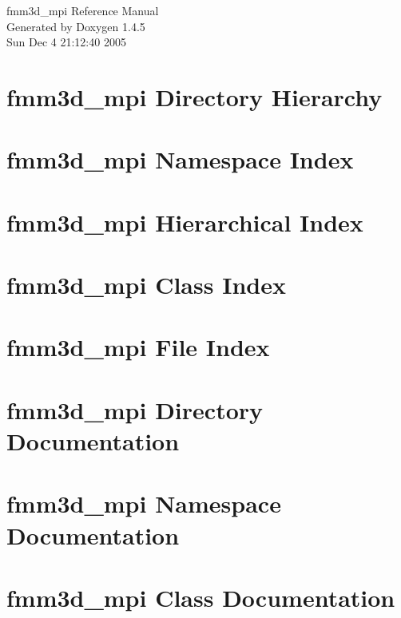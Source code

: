 \documentclass[a4paper]{book}
\begin{document}
\begin{titlepage}
\vspace*{7cm}
\begin{center}
{\Large fmm3d\_\-mpi Reference Manual}\\
\vspace*{1cm}
{\large Generated by Doxygen 1.4.5}\\
\vspace*{0.5cm}
{\small Sun Dec 4 21:12:40 2005}\\
\end{center}
\end{titlepage}
\clearemptydoublepage
{}
\tableofcontents
\clearemptydoublepage
{}
\chapter{fmm3d\_\-mpi Directory Hierarchy}

\chapter{fmm3d\_\-mpi Namespace Index}

\chapter{fmm3d\_\-mpi Hierarchical Index}

\chapter{fmm3d\_\-mpi Class Index}

\chapter{fmm3d\_\-mpi File Index}

\chapter{fmm3d\_\-mpi Directory Documentation}

\chapter{fmm3d\_\-mpi Namespace Documentation}

\chapter{fmm3d\_\-mpi Class Documentation}











\end{document}
